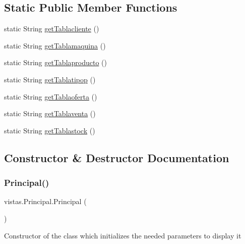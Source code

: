 \subsection*{Static Public Member Functions}
\begin{DoxyCompactItemize}
\item 
static String \mbox{\hyperlink{classvistas_1_1_principal_a2330cd451138f9f602cee0c5c0cd5c08}{get\+Tablacliente}} ()
\item 
static String \mbox{\hyperlink{classvistas_1_1_principal_ac784d0415cbb5e3932f088d68876c91a}{get\+Tablamaquina}} ()
\item 
static String \mbox{\hyperlink{classvistas_1_1_principal_a39c3c478060c985a23f97e38dc88e61b}{get\+Tablaproducto}} ()
\item 
static String \mbox{\hyperlink{classvistas_1_1_principal_a3cf8de4e71a59fc279da130e39af6cd2}{get\+Tablatipop}} ()
\item 
static String \mbox{\hyperlink{classvistas_1_1_principal_afe7ddf018ad429301b1aca1dbfc4770d}{get\+Tablaoferta}} ()
\item 
static String \mbox{\hyperlink{classvistas_1_1_principal_aa81de202b442c060c9db8f564ba288b3}{get\+Tablaventa}} ()
\item 
static String \mbox{\hyperlink{classvistas_1_1_principal_a004b49e26858496e0f5097a079b3aba5}{get\+Tablastock}} ()
\end{DoxyCompactItemize}


\subsection{Constructor \& Destructor Documentation}
\mbox{\label{classvistas_1_1_principal_acf014fac1f15c33d980e722fe1e6d58f}} 
\subsubsection{\texorpdfstring{Principal()}{Principal()}}
{\footnotesize\ttfamily vistas.\+Principal.\+Principal (\begin{DoxyParamCaption}{ }\end{DoxyParamCaption})\hspace{0.3cm}{\ttfamily [inline]}}

Constructor of the class which initializes the needed parameters to display it 


